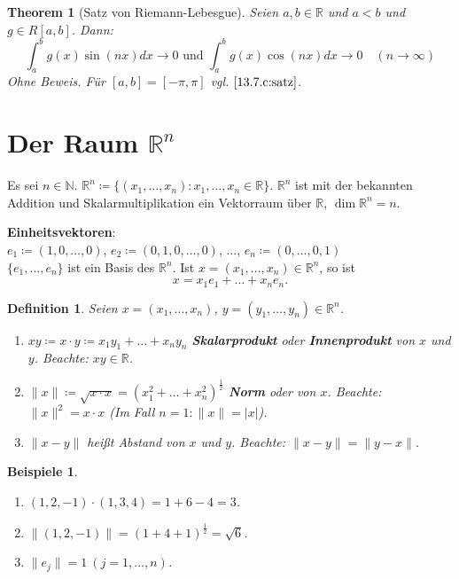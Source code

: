 \documentclass[titlepage,ngerman,a4paper,headsepline]{scrartcl}
\newcommand{\N}{\mathbb{N}}
\newcommand{\R}{\mathbb{R}}
\theoremstyle{named}
\newtheorem{namedtheorem}{Theorem} \counterwithin{namedtheorem}{section}
\theoremstyle{dotless}
\newtheorem*{beispiele}{Beispiele}
\newtheorem*{definition}{Definition}
\begin{document}
\begin{namedtheorem}[Satz von Riemann-Lebesgue] \label{13.8:prop-SatzVonRiemann-Lebesgue}
	Seien $a, b \in \R$ und $a < b$ und $g \in R[a, b]$. Dann:
		$$ \int_{a}^{b} g(x) \sin(nx) dx \rightarrow 0 \text{ und } \int_{a}^{b} g(x) \cos(nx) dx \rightarrow 0 \quad (n \rightarrow \infty) $$
		Ohne Beweis. Für $[a, b] = [-\pi, \pi]$ vgl. $\ref{13.7.c:satz}$.
\end{namedtheorem}

\newpage

\section{\texorpdfstring{Der Raum $\R^{n}$}{Der Raum Rn}}

Es sei $n \in \N$. $\R^{n} \coloneqq \{ (x_{1}, \dotsc, x_{n}) : x_{1}, \dotsc, x_{n} \in \R \}$. $\R^{n}$ ist mit der bekannten Addition und Skalarmultiplikation ein Vektorraum über $\R$, $\dim \R^{n} = n$.

\textbf{Einheitsvektoren}: \\
$e_{1} \coloneqq (1, 0, \dotsc, 0)$, $e_{2} \coloneqq (0, 1, 0, \dotsc, 0)$, $\dotsc$, $e_{n} \coloneqq (0, \dotsc, 0, 1)$ \\
$\{ e_{1}, \dotsc, e_{n} \}$ ist ein Basis des $\R^{n}$. Ist $x = (x_{1}, \dotsc, x_{n}) \in \R^{n}$, so ist
$$ x = x_{1} e_{1} + \dotsc + x_{n} e_{n}. $$

   
\begin{definition}
	Seien $x = (x_{1}, \dotsc, x_{n})$, $y = (y_{1}, \dotsc, y_{n}) \in \R^{n}$.
	\begin{enumerate}
		\item $xy \coloneqq x \cdot y \coloneqq x_{1} y_{1} + \dotsc + x_{n} y_{n}$ \textbf{Skalarprodukt} oder \textbf{Innenprodukt} von $x$ und $y$. Beachte: $xy \in \R$.
		\item $\| x \| \coloneqq \sqrt{x \cdot x} = (x_{1}^{2} + \dotsc + x_{n}^{2})^{\frac{1}{2}}$ \textbf{Norm} oder  von $x$. Beachte: $\|x\|^{2} = x \cdot x$ (Im Fall $n = 1: \|x\| = |x|$).
		\item $\| x - y \|$ hei{\ss}t Abstand von $x$ und $y$. Beachte: $\| x - y \| = \| y - x \|$.
	\end{enumerate}
\end{definition}


\begin{beispiele} ~\
	\begin{enumerate}
		\item $(1, 2, -1) \cdot (1, 3, 4) = 1 + 6 - 4 = 3$.
		\item $\| (1, 2, -1) \| = (1 + 4 + 1)^{\frac{1}{2}} = \sqrt{6}$.
		\item $\| e_{j} \| = 1 ~(j = 1, \dotsc, n)$.
	\end{enumerate}
\end{beispiele}
\end{document}
